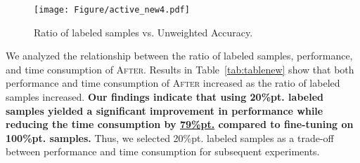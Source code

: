 \documentclass{article}
\begin{document}
\begin{table}[h]
\centering
\caption{\textsc{After} with Entropy~\cite{roy2001toward} to select 10\%pt.$\sim$100\%pt. labeled samples of the Merge Dataset for fine-tuning.}
\label{tab:tablenew}
\end{table}


\begin{figure}[t]
\centering
\texttt{[image: Figure/active\_new4.pdf]}
\caption{Ratio of labeled samples vs. Unweighted Accuracy.}
\label{Ratio}
\end{figure}




We analyzed the relationship between the ratio of labeled samples, performance, and time consumption of \textsc{After}. Results in Table~\ref{tab:tablenew} show that both performance and time consumption  of \textsc{After} increased as the ratio of labeled samples increased. \textbf{Our findings indicate that using 20\%pt. labeled samples yielded a significant improvement in performance while reducing the time consumption by \underline{79\%pt.} compared to fine-tuning on 100\%pt. samples.} Thus, we selected 20\%pt. labeled samples as a trade-off between performance and time consumption for subsequent experiments.
\end{document}
